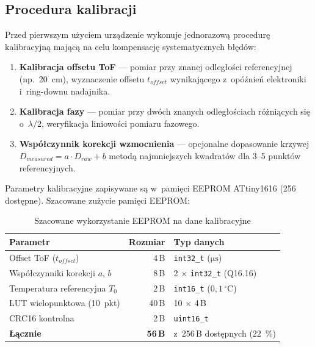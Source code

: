 \documentclass[a4paper,11pt]{article}
\begin{document}
\subsection{Procedura kalibracji}
\label{sec:kalibracja}

Przed pierwszym użyciem urządzenie wykonuje jednorazową procedurę kalibracyjną
mającą na celu kompensację systematycznych błędów:

\begin{enumerate}[nosep]
    \item \textbf{Kalibracja offsetu ToF} --- pomiar przy znanej odległości
          referencyjnej (np.\ \SI{20}{\centi\metre}), wyznaczenie offsetu
          $t_{offset}$ wynikającego z~opóźnień elektroniki i~ring-downu nadajnika.
    \item \textbf{Kalibracja fazy} --- pomiar przy dwóch znanych odległościach
          różniących się o~$\lambda/2$, weryfikacja liniowości pomiaru fazowego.
    \item \textbf{Współczynnik korekcji wzmocnienia} --- opcjonalne dopasowanie
          krzywej $D_{measured} = a \cdot D_{raw} + b$ metodą najmniejszych
          kwadratów dla 3--5 punktów referencyjnych.
\end{enumerate}

Parametry kalibracyjne zapisywane są w~pamięci EEPROM ATtiny1616
(\SI{256}{\byte} dostępne). Szacowane zużycie pamięci EEPROM:

\begin{table}[H]
    \centering
    \caption{Szacowane wykorzystanie EEPROM na dane kalibracyjne}
    \label{tab:eeprom_usage}
    \begin{tabular}{lrl}
        \toprule
        \textbf{Parametr} & \textbf{Rozmiar} & \textbf{Typ danych} \\
        \midrule
        Offset ToF ($t_{offset}$) & 4\,B & \texttt{int32\_t} ($\si{\micro\second}$) \\
        Współczynniki korekcji $a$, $b$ & 8\,B & 2 $\times$ \texttt{int32\_t} (Q16.16) \\
        Temperatura referencyjna $T_0$ & 2\,B & \texttt{int16\_t} ($0{,}1\,^\circ$C) \\
        LUT wielopunktowa (10~pkt) & 40\,B & 10 $\times$ 4\,B \\
        CRC16 kontrolna & 2\,B & \texttt{uint16\_t} \\
        \midrule
        \textbf{Łącznie} & \textbf{56\,B} & z~256\,B dostępnych (\SI{22}{\percent}) \\
        \bottomrule
    \end{tabular}
\end{table}
\end{document}
